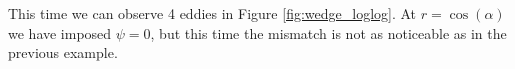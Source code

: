 \begin{example}
This time we can observe 4 eddies in Figure \ref{fig:wedge_loglog}. At $r=\cos(\alpha)$ we have imposed $\psi=0$, but this time the mismatch is not as noticeable as in the previous example.
\begin{figure}[H]
	\centering
\end{figure}
\end{example}
